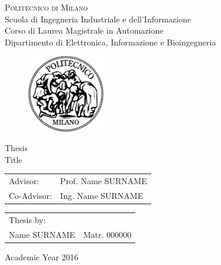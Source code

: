 \begin{titlepage}

\begin{center}
\Large{\textsc{Politecnico di Milano}}\\
\Large{Scuola di Ingegneria Industriale e dell'Informazione}\\
\large{Corso di Laurea Magistrale in Automazione}\\
\large{Dipartimento di Elettronica, Informazione e Bioingegneria}
\par
\end{center}

\vspace{0.5cm}

\begin{center}
\begin{figure}[h]
\centering{}
\includegraphics[width=0.3\textwidth]{title-page/logo-polimi}
\end{figure}
\vspace{1cm}
\par
\end{center}

\begin{center}
\LARGE{Thesis\\
Title}
\vspace{2cm}
\par
\end{center}

\begin{flushleft}
\begin{tabular}{ll}
Advisor:  & Prof. Name SURNAME\tabularnewline
Co-Advisor:  & Ing. Name SURNAME\tabularnewline
\end{tabular}\vspace{1cm}
\par
\end{flushleft}

\begin{flushright}
\begin{tabular}{ll}
Thesis by: & \tabularnewline
Name SURNAME & Matr. 000000\tabularnewline
\end{tabular}\vspace{4cm}
\par
\end{flushright}

\begin{center}
{\large{}Academic Year 2016}
\par
\end{center}{\large \par}

\end{titlepage}